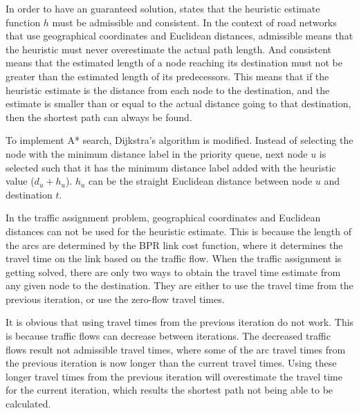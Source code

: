 In order to have an guaranteed solution,
\citet{Astar} states that the heuristic estimate function $h$ must be admissible and consistent.
In the context of road networks that use geographical coordinates and Euclidean distances,
admissible means that the heuristic must never overestimate the actual path length.
And consistent means that the estimated length of a node reaching its destination must not be greater than the estimated length of its predecessors.
This means that if the heuristic estimate is the distance from each node to the destination,
and the estimate is smaller than or equal to the actual distance going to that destination,
then the shortest path can always be found. 


To implement A* search,
Dijkstra's algorithm is modified.
Instead of selecting the node with the minimum distance label in the priority queue,
next node $u$ is selected such that it has the minimum distance label added with the heuristic value ($d_u + h_{u}$).
$h_u$ can be the straight Euclidean distance between node $u$ and destination $t$.

In the traffic assignment problem,
geographical coordinates and Euclidean distances can not be used for the heuristic estimate.
This is because the length of the arcs are determined by the BPR link cost function,
where it determines the travel time on the link based on the traffic flow.
When the traffic assignment is getting solved,
there are only two ways to obtain the travel time estimate from any given node to the destination.
They are either to use the travel time from the previous iteration,
or use the zero-flow travel times.

It is obvious that using travel times from the previous iteration do not work.
This is because traffic flows can decrease between iterations.
The decreased traffic flows result not admissible travel times,
where some of the arc travel times from the previous iteration is now longer than the current travel times.
Using these longer travel times from the previous iteration will overestimate the travel time for the current iteration,
which results the shortest path not being able to be calculated.

